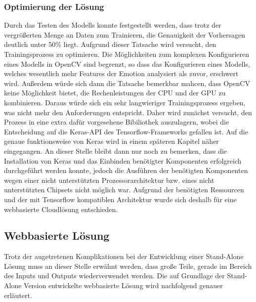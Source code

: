 \documentclass[12pt, a4paper]{scrbook}
\begin{document}
\subsubsection{Optimierung der Lösung}
Durch das Testen des Modells konnte festgestellt werden, dass trotz der vergrößerten Menge an Daten zum Trainieren, die Genauigkeit der Vorhersagen deutlich unter 50\% liegt. Aufgrund dieser Tatsache wird versucht, den Trainingsprozess zu optimieren. Die Möglichkeiten zum komplexen Konfigurieren eines Modells in OpenCV sind begrenzt, so dass das Konfigurieren eines Modells, welches wesentlich mehr Features der Emotion analysiert als zuvor, erschwert wird. Außerdem würde sich dann die Tatsache bemerkbar mahcen, dass OpenCV keine Möglichkeit bietet, die  Rechenleistungen der CPU und der GPU zu kombinieren. Daraus würde sich ein sehr langwieriger Trainingsprozess ergeben, was nicht mehr den Anforderungen entspricht. Daher wird zunächst versucht, den Prozess in eine extra dafür vorgesehene Bibiliothek auszulagern, wobei die Entscheidung auf die Keras-API des Tensorflow-Frameworks gefallen ist. Auf die genaue funktionsweise von Keras wird in einem späteren Kapitel näher eingegangen. An dieser Stelle bleibt dann nur noch zu bemerken, dass die Installation von Keras und das Einbinden benötigter Komponenten erfolgreich durchgeführt werden konnte, jedoch die Ausführen der benötigten Komponenten wegen einer nicht unterstützten Prozessorarchitektur bzw. eines nicht unterstützten Chipsets nicht möglich war. Aufgrund der benötigten Ressourcen und der mit Tensorflow kompatiblen Architektur wurde sich deshalb für eine webbasierte Cloudlösung entschieden.

\subsection{Webbasierte Lösung}
Trotz der augetretenen Komplikationen bei der Entwicklung einer Stand-Alone Lösung muss an dieser Stelle erwähnt werden, dass große Teile, gerade im Bereich des Inputs und Outputs wiederverwendet werden. Die auf Grundlage der Stand-Alone Version entwickelte webbasierte Lösung wird nachfolgend genauer erläutert.
\end{document}
